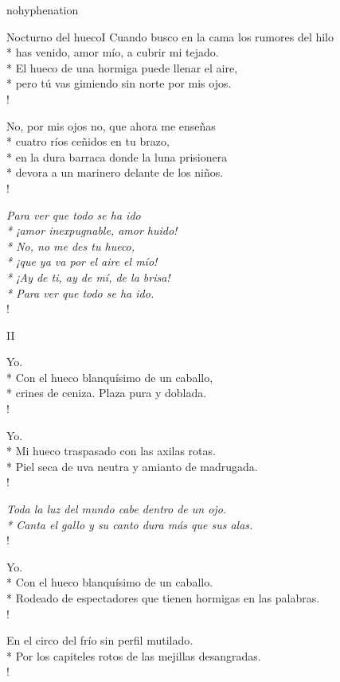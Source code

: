 \documentclass[
    a5paper,
    DIV=10,
    12pt,
    notitlepage,
    oneside,]
{scrbook} %
\begin{document}
\begin{hyphenrules}{nohyphenation}
\begin{poem}{Nocturno del hueco}{I}{}
Cuando busco en la cama los rumores del hilo\\*
has venido, amor mío, a cubrir mi tejado.\\*
El hueco de una hormiga puede llenar el aire,\\*
pero tú vas gimiendo sin norte por mis ojos.\\!

No, por mis ojos no, que ahora me enseñas\\*
cuatro ríos ceñidos en tu brazo,\\*
en la dura barraca donde la luna prisionera\\*
devora a un marinero delante de los niños.\\!

\emph{Para ver que todo se ha ido\\*
¡amor inexpugnable, amor huido!\\*
No, no me des tu hueco,\\*
¡que ya va por el aire el mío!\\*
¡Ay de ti, ay de mí, de la brisa!\\*
Para ver que todo se ha ido.} \\!

\end{poem}

\begin{poem}{II}{}{\vspace{-1em}}

Yo.\\*
Con el hueco blanquísimo de un caballo,\\*
crines de ceniza. Plaza pura y doblada.\\!

Yo.\\*
Mi hueco traspasado con las axilas rotas.\\*
Piel seca de uva neutra y amianto de madrugada.\\!

\emph{Toda la luz del mundo cabe dentro de un ojo.\\*
Canta el gallo y su canto dura más que sus alas.} \\!

Yo.\\*
Con el hueco blanquísimo de un caballo.\\*
Rodeado de espectadores que tienen hormigas en las palabras.\\!

En el circo del frío sin perfil mutilado.\\*
Por los capiteles rotos de las mejillas desangradas.\\!


\end{poem}
\end{hyphenrules}
\end{document}
